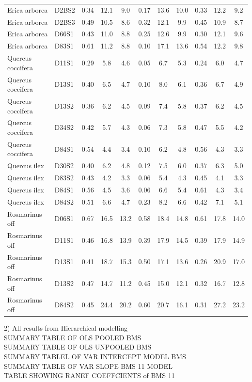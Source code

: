 \documentclass[twocolumn,10pt]{article}
\begin{document}
\begin{table}[H]
\begin{tabular}{llccccccccc}
Erica arborea & D2BS2 & 0.34 & 12.1 & 9.0 & 0.17 & 13.6 & 10.0 & 0.33 & 12.2 & 9.2 \\
Erica arborea & D2BS3 & 0.49 & 10.5 & 8.6 & 0.32 & 12.1 & 9.9 & 0.45 & 10.9 & 8.7 \\
Erica arborea & D66S1 & 0.43 & 11.0 & 8.8 & 0.25 & 12.6 & 9.9 & 0.30 & 12.1 & 9.6 \\
Erica arborea & D83S1 & 0.61 & 11.2 & 8.8 & 0.10 & 17.1 & 13.6 & 0.54 & 12.2 & 9.8 \\
Quercus coccifera & D11S1 & 0.29 & 5.8 & 4.6 & 0.05 & 6.7 & 5.3 & 0.24 & 6.0 & 4.7 \\
Quercus coccifera & D13S1 & 0.40 & 6.5 & 4.7 & 0.10 & 8.0 & 6.1 & 0.36 & 6.7 & 4.9 \\
Quercus coccifera & D13S2 & 0.36 & 6.2 & 4.5 & 0.09 & 7.4 & 5.8 & 0.37 & 6.2 & 4.5 \\
Quercus coccifera & D34S2 & 0.42 & 5.7 & 4.3 & 0.06 & 7.3 & 5.8 & 0.47 & 5.5 & 4.2 \\
Quercus coccifera & D84S1 & 0.54 & 4.4 & 3.4 & 0.10 & 6.2 & 4.8 & 0.56 & 4.3 & 3.3 \\
Quercus ilex & D30S2 & 0.40 & 6.2 & 4.8 & 0.12 & 7.5 & 6.0 & 0.37 & 6.3 & 5.0 \\
Quercus ilex & D83S2 & 0.43 & 4.2 & 3.3 & 0.06 & 5.4 & 4.3 & 0.45 & 4.1 & 3.3 \\
Quercus ilex & D84S1 & 0.56 & 4.5 & 3.6 & 0.06 & 6.6 & 5.4 & 0.61 & 4.3 & 3.4 \\
Quercus ilex & D84S2 & 0.51 & 6.6 & 4.7 & 0.23 & 8.2 & 6.6 & 0.42 & 7.1 & 5.1 \\
Rosmarinus off & D06S1 & 0.67 & 16.5 & 13.2 & 0.58 & 18.4 & 14.8 & 0.61 & 17.8 & 14.0 \\
Rosmarinus off & D11S1 & 0.46 & 16.8 & 13.9 & 0.39 & 17.9 & 14.5 & 0.39 & 17.9 & 14.9 \\
Rosmarinus off & D13S1 & 0.41 & 18.7 & 15.3 & 0.50 & 17.1 & 13.6 & 0.26 & 20.9 & 17.0 \\
Rosmarinus off & D13S2 & 0.47 & 14.7 & 11.2 & 0.45 & 15.0 & 12.1 & 0.32 & 16.7 & 12.8 \\
Rosmarinus off & D84S2 & 0.45 & 24.4 & 20.2 & 0.60 & 20.7 & 16.1 & 0.31 & 27.2 & 23.2 \\
\end{tabular}
\end{table}
2) All results from Hierarchical modelling \\
SUMMARY TABLE OF OLS POOLED BMS \\
SUMMARY TABLE OF OLS UNPOOLED BMS\\
SUMMARY TABLEL OF VAR INTERCEPT MODEL BMS\\
SUMMARY TABLE OF VAR SLOPE BMS 11 MODEL \\
TABLE SHOWING RANEF COEFFCIENTS of BMS 11\\
\end{document}
